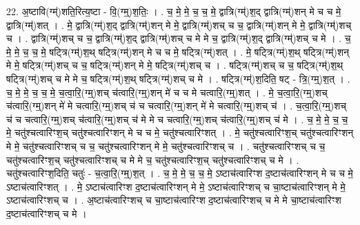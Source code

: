 \documentclass[17pt]{extarticle}
\begin{document}
22. अ॒ष्टावि(ग्म्॑)शति॒रित्य॒ष्टा - वि॒(ग्म्॒)श॒तिः॒ । . च॒ मे॒ मे॒ च॒ च॒ मे॒ द्वात्रि(ग्म्॑)श॒द् द्वात्रि(ग्म्॑)शन् मे च च मे॒ द्वात्रि(ग्म्॑)शत् । . मे॒ द्वात्रि(ग्म्॑)श॒द् द्वात्रि(ग्म्॑)शन् मे मे॒ द्वात्रि(ग्म्॑)शच् च च॒ द्वात्रि(ग्म्॑)शन् मे मे॒ द्वात्रि(ग्म्॑)शच् च । . द्वात्रि(ग्म्॑)शच् च च॒ द्वात्रि(ग्म्॑)श॒द् द्वात्रि(ग्म्॑)शच् च मे मे च॒ द्वात्रि(ग्म्॑)श॒द् द्वात्रि(ग्म्॑)शच् च मे । . च॒ मे॒ मे॒ च॒ च॒ मे॒ षट्त्रि(ग्म्॑)श॒थ् षट्त्रि(ग्म्॑)शन् मे च च मे॒ षट्त्रि(ग्म्॑)शत् । . मे॒ षट्त्रि(ग्म्॑)श॒थ् षट्त्रि(ग्म्॑)शन् मे मे॒ षट्त्रि(ग्म्॑)शच् च च॒ षट्त्रि(ग्म्॑)शन् मे मे॒ षट्त्रि(ग्म्॑)शच् च । . षट्त्रि(ग्म्॑)शच् च च॒ षट्त्रि(ग्म्॑)श॒थ् षट्त्रि(ग्म्॑)शच् च मे मे च॒ षट्त्रि(ग्म्॑)श॒थ् षट्त्रि(ग्म्॑)शच् च मे । . षट्त्रि(ग्म्॑)श॒दिति॒ षट् - त्रि॒(ग्म्॒)श॒त् । . च॒ मे॒ मे॒ च॒ च॒ मे॒ च॒त्वा॒रि॒(ग्म्॒)शच् च॑त्वारि॒(ग्म्॒)शन् मे॑ च च मे चत्वारि॒(ग्म्॒)शत् । . मे॒ च॒त्वा॒रि॒(ग्म्॒)शच् च॑त्वारि॒(ग्म्॒)शन् मे॑ मे चत्वारि॒(ग्म्॒)शच् च॑ च चत्वारि॒(ग्म्॒)शन् मे॑ मे चत्वारि॒(ग्म्॒)शच् च॑ । . च॒त्वा॒रि॒(ग्म्॒)शच् च॑ च चत्वारि॒(ग्म्॒)शच् च॑त्वारि॒(ग्म्॒)शच् च॑ मे मे च चत्वारि॒(ग्म्॒)शच् च॑त्वारि॒(ग्म्॒)शच् च॑ मे । . च॒ मे॒ मे॒ च॒ च॒ मे॒ चतु॑श्चत्वारिꣳश॒च् चतु॑श्चत्वारिꣳशन् मे च च मे॒ चतु॑श्चत्वारिꣳशत् । . मे॒ चतु॑श्चत्वारिꣳश॒च् चतु॑श्चत्वारिꣳशन् मे मे॒ चतु॑श्चत्वारिꣳशच् च च॒ चतु॑श्चत्वारिꣳशन् मे मे॒ चतु॑श्चत्वारिꣳशच् च । . चतु॑श्चत्वारिꣳशच् च च॒ चतु॑श्चत्वारिꣳश॒च् चतु॑श्चत्वारिꣳशच् च मे मे च॒ चतु॑श्चत्वारिꣳश॒च् चतु॑श्चत्वारिꣳशच् च मे । . चतु॑श्चत्वारिꣳश॒दिति॒ चतुः॑ - च॒त्वा॒रि॒(ग्म्॒)श॒त् । . च॒ मे॒ मे॒ च॒ च॒ मे॒ ऽष्टाच॑त्वारिꣳश द॒ष्टाच॑त्वारिꣳशन् मे च च मे॒ ऽष्टाच॑त्वारिꣳशत् । . मे॒ ऽष्टाच॑त्वारिꣳश द॒ष्टाच॑त्वारिꣳशन् मे मे॒ ऽष्टाच॑त्वारिꣳशच् च चा॒ष्टाच॑त्वारिꣳशन् मे मे॒ ऽष्टाच॑त्वारिꣳशच् च । . अ॒ष्टाच॑त्वारिꣳशच् च चा॒ष्टाच॑त्वारिꣳश द॒ष्टाच॑त्वारिꣳशच् च मे मे चा॒ष्टाच॑त्वारिꣳश द॒ष्टाच॑त्वारिꣳशच् च मे । \newline
\end{document}
